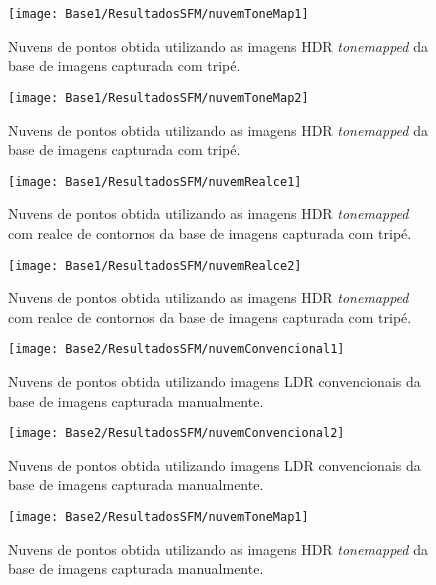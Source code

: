 \begin{figure}[H]
  \centering 
  \texttt{[image: Base1/ResultadosSFM/nuvemToneMap1]}
  \caption{Nuvens de pontos obtida utilizando as imagens HDR \textit{tonemapped} da base de imagens capturada com tripé.}
  \label{figNuvemPontosB}
\end{figure}

\begin{figure}[H]
  \centering 
  \texttt{[image: Base1/ResultadosSFM/nuvemToneMap2]}
  \caption{Nuvens de pontos obtida utilizando as imagens HDR \textit{tonemapped} da base de imagens capturada com tripé.}
  \label{figNuvemPontosB2}
\end{figure}

\begin{figure}[H]
  \centering 
  \texttt{[image: Base1/ResultadosSFM/nuvemRealce1]}
  \caption{Nuvens de pontos obtida utilizando as imagens HDR \textit{tonemapped} com realce de contornos da base de imagens capturada com tripé.}
  \label{figNuvemPontosC}
\end{figure}

\begin{figure}[H]
  \centering 
  \texttt{[image: Base1/ResultadosSFM/nuvemRealce2]}
  \caption{Nuvens de pontos obtida utilizando as imagens HDR \textit{tonemapped} com realce de contornos da base de imagens capturada com tripé.}
  \label{figNuvemPontosC2}
\end{figure}

\begin{figure}[H]
  \centering 
  \texttt{[image: Base2/ResultadosSFM/nuvemConvencional1]}
  \caption{Nuvens de pontos obtida utilizando imagens LDR convencionais da base de imagens capturada manualmente.}
  \label{figNuvemPontos2A}
\end{figure}

\begin{figure}[H]
  \centering 
  \texttt{[image: Base2/ResultadosSFM/nuvemConvencional2]}
  \caption{Nuvens de pontos obtida utilizando imagens LDR convencionais da base de imagens capturada manualmente.}
  \label{figNuvemPontos2A2}
\end{figure}

\begin{figure}[H]
  \centering 
  \texttt{[image: Base2/ResultadosSFM/nuvemToneMap1]}
  \caption{Nuvens de pontos obtida utilizando as imagens HDR \textit{tonemapped} da base de imagens capturada manualmente.}
  \label{figNuvemPontos2B}
\end{figure}

